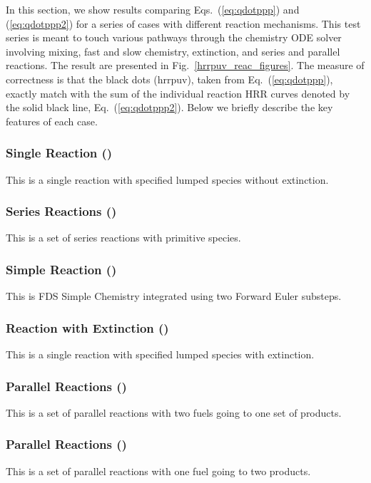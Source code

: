\documentclass[11pt]{book}
\begin{document}
In this section, we show results comparing Eqs.~(\ref{eq:qdotppp}) and (\ref{eq:qdotppp2}) for a series of cases with different reaction mechanisms.  This test series is meant to touch various pathways through the chemistry ODE solver involving mixing, fast and slow chemistry, extinction, and series and parallel reactions.  The result are presented in Fig.~\ref{hrrpuv_reac_figures}.  The measure of correctness is that the black dots (hrrpuv), taken from Eq.~(\ref{eq:qdotppp}), exactly match with the sum of the individual reaction HRR curves denoted by the solid black line, Eq.~(\ref{eq:qdotppp2}). Below we briefly describe the key features of each case.

\subsubsection{Single Reaction ()} This is a single reaction with specified lumped species without extinction.

\subsubsection{Series Reactions ()} This is a set of series reactions with primitive species.

\subsubsection{Simple Reaction ()} This is FDS Simple Chemistry integrated using two Forward Euler substeps.

\subsubsection{Reaction with Extinction ()} This is a single reaction with specified lumped species with extinction.

\subsubsection{Parallel Reactions ()} This is a set of parallel reactions with two fuels going to one set of products.

\subsubsection{Parallel Reactions ()} This is a set of parallel reactions with one fuel going to two products.
\end{document}
